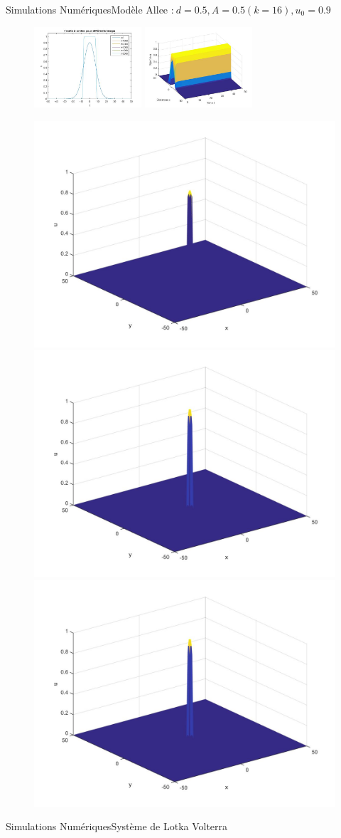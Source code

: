 \documentclass[10pt]{beamer}
\begin{document}
\begin{frame}{Simulations Numériques}{Modèle Allee :$\ d=0.5, A=0.5 (k=16), u_0=0.9$}
\begin{figure}[H]
	\centering
	\includegraphics[width=0.40\linewidth, height=3cm]{Allee/F2333}\hfill
	\includegraphics[width=0.55\linewidth, height=3cm]{Allee/F4333}
\end{figure}
\begin{figure}[H]
	\centering
	\includegraphics[width=0.3\linewidth]{Allee/333__1_}\hfill
    \includegraphics[width=0.3\linewidth]{Allee/333__2_}\hfill
	\includegraphics[width=0.3\linewidth]{Allee/333__3_}
\end{figure}
\end{frame}

\begin{frame}{Simulations Numériques}{Système de Lotka Volterra}
\end{frame}
\end{document}

